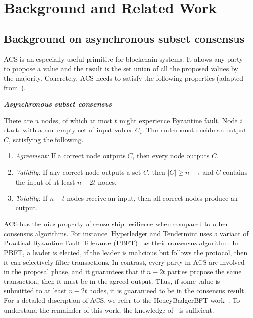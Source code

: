 
\section{Background and Related Work}

\subsection{Background on asynchronous subset consensus}
\label{sec:acs-background}

ACS is an especially useful primitive for blockchain systems.
It allows any party to propose a value and the result is the set union of all the proposed values by the majority.
Concretely, ACS needs to satisfy the following properties (adapted from~\cite{miller2016honey}).
\begin{definition}
\label{def:acs}
\textbf{\emph{Asynchronous subset consensus}}

There are $n$ nodes, of which at most $t$ might experience Byzantine fault.
Node $i$ starts with a non-empty set of input values $C_i$.
The nodes must decide an output $C$, satisfying the following.
\begin{enumerate}
    \item \emph{Agreement:}
        If a correct node outputs $C$, then every node outputs $C$.
    \item \emph{Validity:}
        If any correct node outputs a set $C$,
        then $|C| \ge n - t$ and $C$ contains the input of at least $n - 2t$ nodes.
    \item \emph{Totality:}
        If $n - t$ nodes receive an input, then all correct nodes produce an output.
\end{enumerate}
\end{definition}

ACS has the nice property of censorship resilience when compared to other consensus algorithms.
For instance, Hyperledger and Tendermint uses a variant of Practical Byzantine Fault Tolerance (PBFT)~\cite{castro1999practical} as their consensus algorithm.
In PBFT, a leader is elected, if the leader is malicious but follows the protocol, then it can selectively filter transactions.
In contrast, every party in ACS are involved in the proposal phase,
and it guarantees that if $n - 2t$ parties propose the same transaction, then it must be in the agreed output.
Thus, if some value is submitted to at least $n - 2t$ nodes, it is guaranteed to be in the consensus result.
For a detailed description of ACS, we refer to the HoneyBadgerBFT work~\cite{miller2016honey}.
To understand the remainder of this work, the knowledge of~ is sufficient.

